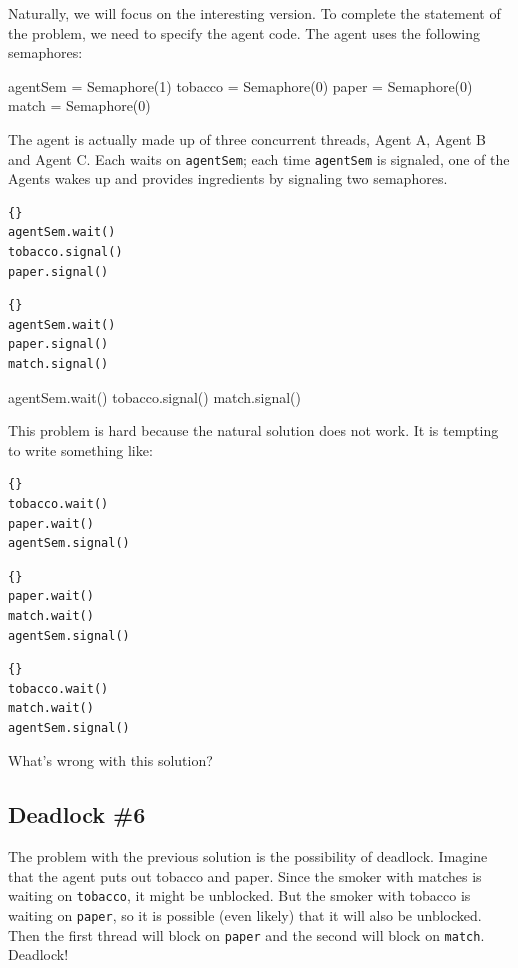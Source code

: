 \documentclass{book}
\begin{document}
Naturally, we will focus on the interesting version.  To complete
the statement of the problem, we need to specify the agent code.
The agent uses the following semaphores:

\begin{unbreakable}[title={Agent semaphores}]{}
agentSem = Semaphore(1)
tobacco = Semaphore(0)
paper = Semaphore(0)
match = Semaphore(0)
\end{unbreakable}

The agent is actually made up of three concurrent
threads, Agent A, Agent B and Agent C.  Each waits on
    {\tt agentSem}; each time {\tt agentSem} is signaled,
one of the Agents wakes up and provides ingredients by
signaling two semaphores.

\begin{lstlisting}[title={Agent A code}]{}
agentSem.wait()
tobacco.signal()
paper.signal()
\end{lstlisting}
\begin{lstlisting}[title={Agent B code}]{}
agentSem.wait()
paper.signal()
match.signal()
\end{lstlisting}
\begin{unbreakable}[title={Agent C code}]{}
agentSem.wait()
tobacco.signal()
match.signal()
\end{unbreakable}

This problem is hard because the natural solution does not
work.  It is tempting to write something like:

\begin{lstlisting}[title={Smoker with matches}]{}
tobacco.wait()
paper.wait()
agentSem.signal()
\end{lstlisting}
\begin{lstlisting}[title={Smoker with tobacco}]{}
paper.wait()
match.wait()
agentSem.signal()
\end{lstlisting}
\begin{lstlisting}[title={Smoker with paper}]{}
tobacco.wait()
match.wait()
agentSem.signal()
\end{lstlisting}

What's wrong with this solution?


\subsection{Deadlock \#6}

The problem with the previous solution is the possibility
of deadlock.  Imagine that the agent puts out tobacco and
paper.  Since the smoker with matches is waiting on {\tt tobacco},
it might be unblocked.  But the smoker with tobacco is
waiting on {\tt paper}, so it is possible (even likely) that
it will also be unblocked.  Then the first thread will block
on {\tt paper} and the second will block on {\tt match}.
Deadlock!
\end{document}

